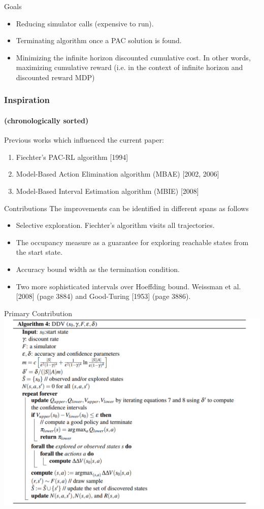 \documentclass[11pt]{beamer}
\begin{document}
\begin{frame}{Goals}
    \begin{itemize}
        \item Reducing simulator calls (expensive to run).
        \item Terminating algorithm once a PAC solution is found.
        \item Minimizing the infinite horizon discounted cumulative cost. In other words, maximizing cumulative reward (i.e. in the context of infinite horizon and discounted reward MDP) 
    \end{itemize}
\end{frame}

\begin{frame}
    \frametitle{Inspiration}
    \framesubtitle{(chronologically sorted)}
Previous works which influenced the current paper:
\begin{enumerate}
    \item Fiechter's PAC-RL algorithm [1994]
    \item Model-Based Action Elimination algorithm (MBAE) [2002, 2006]
    \item Model-Based Interval Estimation algorithm (MBIE) [2008]
\end{enumerate}
\end{frame}

\begin{frame}{Contributions}
The improvements can be identified in different spans as follows
    \begin{itemize}
        \item Selective exploration. Fiechter's algorithm visits all trajectories.
        \item The occupancy measure as a guarantee for exploring reachable states from the start state.
        \item Accuracy bound width as the termination condition.
        \item Two more sophisticated intervals over Hoeffding bound. Weissman et al. [2008] (page 3884) and Good-Turing [1953] (page 3886).
        
    \end{itemize}
\end{frame}

\begin{frame}{Primary Contribution}
\includegraphics[width=0.9\columnwidth]{alg-ddv.png}
\end{frame}  
\end{document}
